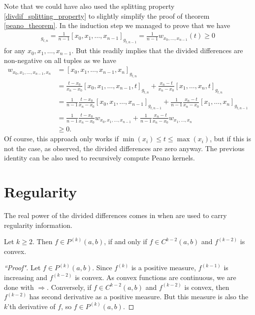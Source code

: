 Note that we could have also used the splitting property \ref{divdif_splitting_property} to slightly simplify the proof of theorem \ref{peano_theorem}. In the induction step we managed to prove that we have
\begin{align*}
	[x_{0}, x_{1}, \ldots, x_{n - 1}, t]_{g_{t, n}} = \frac{1}{n - 1}[x_{0}, x_{1}, \ldots, x_{n - 1}]_{g_{t, n - 1}} =  \frac{1}{n - 1} w_{x_{0}, \ldots, x_{n - 1}}(t)\geq 0
\end{align*}
for any $x_{0}, x_{1}, \ldots, x_{n - 1}$. But this readily implies that the divided differences are non-negative on all tuples as we have
\begin{align*}
	w_{x_{0}, x_{1}, \ldots, x_{n - 1}, x_{n}} &= [x_{0}, x_{1}, \ldots, x_{n - 1}, x_{n}]_{g_{t, n}} \\
	&= \frac{t - x_{0}}{x_{n} - x_{0}} [x_{0}, x_{1}, \ldots, x_{n - 1}, t]_{g_{t, n}} + \frac{x_{n} - t}{x_{n} - x_{0}} [x_{1}, \ldots, x_{n}, t]_{g_{t, n}} \\
	&= \frac{1}{n - 1} \frac{t - x_{0}}{x_{n} - x_{0}} [x_{0}, x_{1}, \ldots, x_{n - 1}]_{g_{t, n - 1}} + \frac{1}{n - 1}\frac{x_{n} - t}{x_{n} - x_{0}} [x_{1}, \ldots, x_{n}]_{g_{t, n - 1}} \\
	&= \frac{1}{n - 1}  \frac{t - x_{0}}{x_{n} - x_{0}} w_{x_{0}, x_{1}, \ldots, x_{n - 1}} + \frac{1}{n - 1}\frac{x_{n} - t}{x_{n} - x_{0}} w_{x_{1}, \ldots, x_{n}} \\
	&\geq 0.
\end{align*}
Of course, this approach only works if $\min(x_{i}) \leq t \leq \max(x_{i})$, but if this is not the case, as observed, the divided differences are zero anyway. The previous identity can be also used to recursively compute Peano kernels.

\section{Regularity}

The real power of the divided differences comes in when are used to carry regularity information.

\begin{lause}\label{k-tone_smooth}
	Let $k \geq 2$. Then $f \in P^{(k)}(a, b)$, if and only if $f \in C^{k - 2}(a, b)$ and $f^{(k - 2)}$ is convex.
\end{lause}
\begin{proof}[``Proof"]
	Let $f \in P^{(k)}(a, b)$. Since $f^{(k)}$ is a positive measure, $f^{(k - 1)}$ is increasing and $f^{(k - 2)}$ is convex. As convex functions are continuous, we are done with $\Rightarrow$. Conversely, if $f \in C^{k - 2}(a, b)$ and $f^{(k - 2)}$ is convex, then $f^{(k - 2)}$ has second derivative as a positive measure. But this measure is also the $k$'th derivative of $f$, so $f \in P^{(k)}(a, b)$.
\end{proof}

